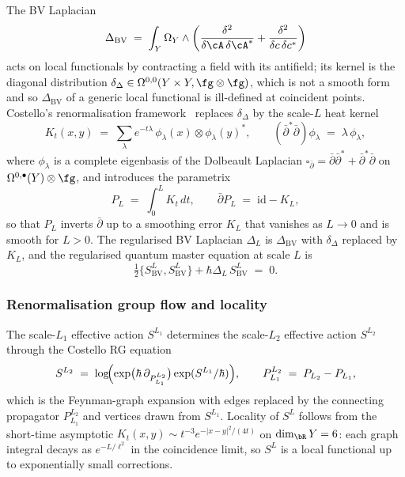The BV Laplacian
\begin{equation}\label{eq:6dhcs-bv-laplacian}
 \Delta_{\mathrm{BV}}
 \;=\;
 \int_{Y} \Omega_Y \wedge
 \biggl(
 \frac{\delta^2}{\delta \cA \, \delta \cA^*}
 + \frac{\delta^2}{\delta c \, \delta c^*}
 \biggr)
\end{equation}
acts on local functionals by contracting a field with its antifield;
its kernel is the diagonal distribution $\delta_\Delta\in
\Omega^{0,0}(Y\times Y,\fg\otimes\fg)$, which is not a smooth form
and so $\Delta_{\mathrm{BV}}$ of a generic local functional is
ill-defined at coincident points. Costello's renormalisation
framework~\cite{costello-renormalization} replaces $\delta_\Delta$
by the scale-$L$ heat kernel
\begin{equation}\label{eq:6dhcs-heat-kernel}
 K_t(x,y)
 \;=\;
 \sum_\lambda e^{-t\lambda}\,\phi_\lambda(x)\otimes\phi_\lambda(y)^*,
 \qquad
 (\bar\partial^*\bar\partial)\phi_\lambda \;=\; \lambda\,\phi_\lambda,
\end{equation}
where $\phi_\lambda$ is a complete eigenbasis of the Dolbeault
Laplacian $\square_{\bar\partial}=\bar\partial\bar\partial^*
+\bar\partial^*\bar\partial$ on
$\Omega^{0,\bullet}(Y)\otimes\fg$, and introduces the parametrix
\begin{equation}\label{eq:6dhcs-parametrix}
 P_L \;=\; \int_0^L K_t\,dt,
 \qquad
 \bar\partial P_L \;=\; \mathrm{id} - K_L,
\end{equation}
so that $P_L$ inverts $\bar\partial$ up to a smoothing error $K_L$
that vanishes as $L\to 0$ and is smooth for $L>0$. The regularised
BV Laplacian $\Delta_L$ is $\Delta_{\mathrm{BV}}$ with $\delta_\Delta$
replaced by $K_L$, and the regularised quantum master equation at
scale $L$ is
\begin{equation}\label{eq:6dhcs-qme}
 \tfrac12 \{S^L_{\mathrm{BV}}, S^L_{\mathrm{BV}}\}
 + \hbar \Delta_L\,S^L_{\mathrm{BV}}
 \;=\; 0.
\end{equation}

\subsubsection{Renormalisation group flow and locality}
\label{subsubsec:6dhcs-rg-flow}

The scale-$L_1$ effective action $S^{L_1}$ determines the
scale-$L_2$ effective action $S^{L_2}$ through the Costello RG
equation
\begin{equation}\label{eq:6dhcs-rg}
 S^{L_2}
 \;=\;
 \log\!\Bigl(\exp\bigl(\hbar\,\partial_{P_{L_1}^{L_2}}\bigr)
 \exp(S^{L_1}/\hbar)\Bigr),
 \qquad
 P_{L_1}^{L_2} \;=\; P_{L_2}-P_{L_1},
\end{equation}
which is the Feynman-graph expansion with edges replaced by the
connecting propagator $P_{L_1}^{L_2}$ and vertices drawn from
$S^{L_1}$. Locality of $S^L$ follows from the short-time asymptotic
$K_t(x,y)\sim t^{-3}e^{-|x-y|^2/(4t)}$ on $\dim_\bR Y=6$: each graph
integral decays as $e^{-L/\ell^2}$ in the coincidence limit, so
$S^L$ is a local functional up to exponentially small corrections.

